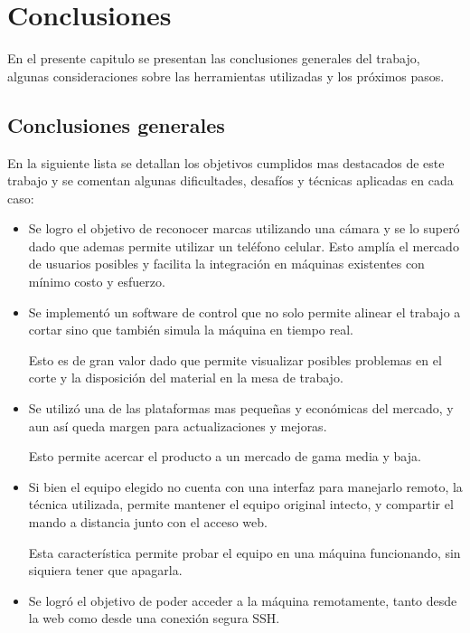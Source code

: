 \chapter{Conclusiones}
\label{Chapter5}
En el presente capitulo se presentan las conclusiones generales del trabajo, algunas consideraciones sobre las herramientas utilizadas y los próximos pasos.

\section{Conclusiones generales }

En la siguiente lista se detallan los objetivos cumplidos mas destacados de este trabajo y se comentan algunas dificultades, desafíos y técnicas aplicadas en cada caso:

\begin{itemize}
   \item{Se logro el objetivo de reconocer marcas utilizando una cámara y se lo superó dado que ademas permite utilizar un teléfono celular. Esto amplía el mercado de usuarios posibles y facilita la integración en máquinas existentes con mínimo costo y esfuerzo.}

   \item{Se implementó un software de control que no solo permite alinear el trabajo a cortar sino que también simula la máquina en tiempo real.\par 
      Esto es de gran valor dado que permite visualizar posibles problemas en el corte y la disposición del material en la mesa de trabajo.}

   \item{Se utilizó una de las plataformas mas pequeñas y económicas del mercado, y aun así queda margen para actualizaciones y mejoras.\par
      Esto permite acercar el producto a un mercado de gama media y baja.}

   \item{Si bien el equipo elegido no cuenta con una interfaz para manejarlo remoto, la técnica utilizada, permite mantener el equipo original intecto, y compartir el mando a distancia junto con el acceso web. \par
      Esta característica permite probar el equipo en una máquina funcionando, sin siquiera tener que apagarla.}

   \item{Se logró el objetivo de poder acceder a la máquina remotamente, tanto desde la web como desde una conexión segura SSH.}


\end{itemize}
